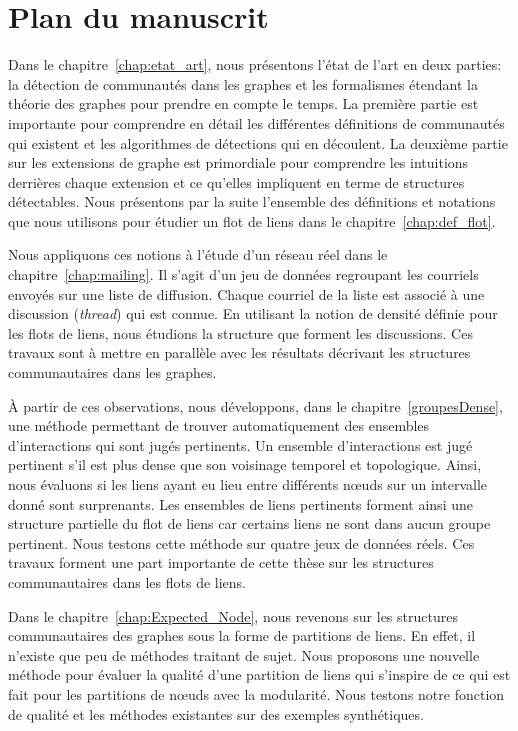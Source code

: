 \section*{Plan du manuscrit}


Dans le chapitre~\ref{chap:etat_art}, nous présentons l'état de l'art en deux parties: la détection de communautés dans les graphes et les formalismes étendant la théorie des graphes pour prendre en compte le temps.
La première partie est importante pour comprendre en détail les différentes définitions de communautés qui existent et les algorithmes de détections qui en découlent.
La deuxième partie sur les extensions de graphe est primordiale pour comprendre les intuitions derrières chaque extension et ce qu'elles impliquent en terme de structures détectables.
Nous présentons par la suite l'ensemble des définitions et notations que nous utilisons pour étudier un flot de liens dans le chapitre~\ref{chap:def_flot}.

Nous appliquons ces notions à l'étude d'un réseau réel dans le chapitre~\ref{chap:mailing}.
Il s'agit d'un jeu de données regroupant les courriels envoyés sur une liste de diffusion.
Chaque courriel de la liste est associé à une discussion (\emph{thread}) qui est connue.
En utilisant la notion de densité définie pour les flots de liens, nous étudions la structure que forment les discussions.
Ces travaux sont à mettre en parallèle avec les résultats décrivant les structures communautaires dans les graphes.


\`A partir de ces observations, nous développons, dans le chapitre~\ref{groupesDense}, une méthode permettant de trouver automatiquement des ensembles d'interactions qui sont jugés pertinents.
Un ensemble d'interactions est jugé pertinent s’il est plus dense que son voisinage temporel et topologique.
Ainsi, nous évaluons si les liens ayant eu lieu entre différents n\oe{}uds sur un intervalle donné sont surprenants.
Les  ensembles de liens pertinents forment ainsi une structure partielle du flot de liens car certains liens ne sont dans aucun groupe pertinent.
Nous testons cette méthode sur quatre jeux de données réels.
Ces travaux forment une part importante de cette thèse sur les structures communautaires dans les flots de liens.

Dans le chapitre~\ref{chap:Expected_Node}, nous revenons sur les structures communautaires des graphes sous la forme de partitions de liens.
En effet, il n'existe que peu de méthodes traitant de sujet.
Nous proposons une nouvelle méthode pour évaluer la qualité d'une partition de liens qui s'inspire de ce qui est fait pour les partitions de n\oe{}uds avec la modularité.
Nous testons notre fonction de qualité et les méthodes existantes sur des exemples synthétiques.

